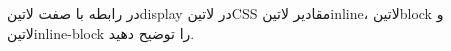 
در رابطه با صفت ‌لاتین{display} در ‌لاتین{CSS} مقادیر ‌لاتین{inline}، ‌لاتین{block} و ‌لاتین{inline-block} را توضیح دهید.

